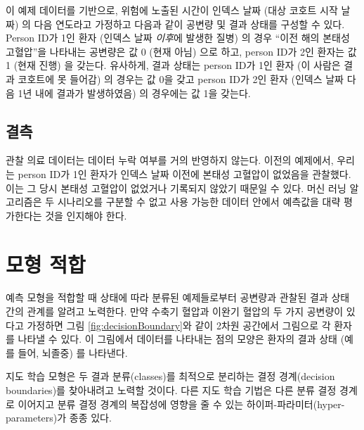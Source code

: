 \documentclass[11pt]{book}
\theoremstyle{definition}
\theoremstyle{definition}
\theoremstyle{definition}
\theoremstyle{remark}
\begin{document}
이 예제 데이터를 기반으로, 위험에 노출된 시간이 인덱스 날짜 (대상 코호트
시작 날짜) 의 다음 연도라고 가정하고 다음과 같이 공변량 및 결과 상태를
구성할 수 있다. Person ID가 1인 환자 (인덱스 날짜 \emph{이후}에 발생한
질병) 의 경우 ``이전 해의 본태성 고혈압''을 나타내는 공변량은 값 0 (현재
아님) 으로 하고, person ID가 2인 환자는 값 1 (현재 진행) 을 갖는다.
유사하게, 결과 상태는 person ID가 1인 환자 (이 사람은 결과 코호트에 못
들어감) 의 경우는 값 0을 갖고 person ID가 2인 환자 (인덱스 날짜 다음 1년
내에 결과가 발생하였음) 의 경우에는 값 1을 갖는다.

\subsection{결측}

관찰 의료 데이터는 데이터 누락 여부를 거의 반영하지 않는다. 이전의
예제에서, 우리는 person ID가 1인 환자가 인덱스 날짜 이전에 본태성
고혈압이 없었음을 관찰했다. 이는 그 당시 본태성 고혈압이 없었거나
기록되지 않았기 때문일 수 있다. 머신 러닝 알고리즘은 두 시나리오를
구분할 수 없고 사용 가능한 데이터 안에서 예측값을 대략 평가한다는 것을
인지해야 한다. 

\section{모형 적합}\label{modelFitting}

예측 모형을 적합할 때 상태에 따라 분류된 예제들로부터 공변량과 관찰된
결과 상태 간의 관계를 알려고 노력한다. 만약 수축기 혈압과 이완기 혈압의
두 가지 공변량이 있다고 가정하면 그림 \ref{fig:decisionBoundary}와 같이
2차원 공간에서 그림으로 각 환자를 나타낼 수 있다. 이 그림에서 데이터를
나타내는 점의 모양은 환자의 결과 상태 (예를 들어, 뇌졸중) 를 나타낸다.

지도 학습 모형은 두 결과 분류(classes)를 최적으로 분리하는 결정
경계(decision boundaries)를 찾아내려고 노력할 것이다. 다른 지도 학습
기법은 다른 분류 결정 경계로 이어지고 분류 결정 경계의 복잡성에 영향을
줄 수 있는 하이퍼-파라미터(hyper-parameters)가 종종 있다.
\end{document}
